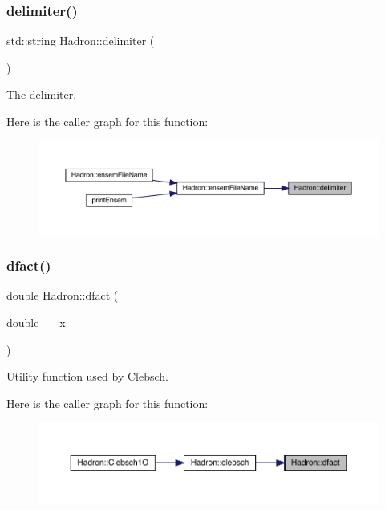 \subsubsection{\texorpdfstring{delimiter()}{delimiter()}}
{\footnotesize\ttfamily std\+::string Hadron\+::delimiter (\begin{DoxyParamCaption}{ }\end{DoxyParamCaption})}



The delimiter. 

Here is the caller graph for this function\+:\nopagebreak
\begin{figure}[H]
\begin{center}
\leavevmode
\includegraphics[width=350pt]{d1/daf/namespaceHadron_a2ea4a74b346adec57d30f2605fc00005_icgraph}
\end{center}
\end{figure}
\mbox{\label{namespaceHadron_a5851b4dcb78567e53c44241a6db6c87e}} 
\subsubsection{\texorpdfstring{dfact()}{dfact()}}
{\footnotesize\ttfamily double Hadron\+::dfact (\begin{DoxyParamCaption}\item[{double}]{\+\_\+\+\_\+x }\end{DoxyParamCaption})\hspace{0.3cm}{\ttfamily [inline]}}



Utility function used by Clebsch. 

Here is the caller graph for this function\+:\nopagebreak
\begin{figure}[H]
\begin{center}
\leavevmode
\includegraphics[width=350pt]{d1/daf/namespaceHadron_a5851b4dcb78567e53c44241a6db6c87e_icgraph}
\end{center}
\end{figure}
\mbox{\label{namespaceHadron_aad081d14cd95160e164751fe86cff3af}} 
